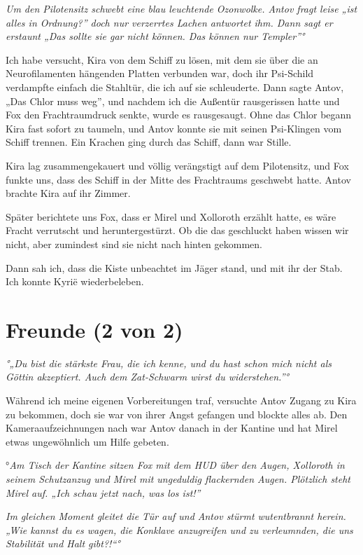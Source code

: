 \documentclass[11pt]{article}
\begin{document}
\emph{Um den Pilotensitz schwebt eine blau leuchtende Ozonwolke. Antov
fragt leise „ist alles in Ordnung?'' doch nur verzerrtes Lachen
antwortet ihm. Dann sagt er erstaunt „Das sollte sie gar nicht können.
Das können nur Templer''°}

Ich habe versucht, Kira von dem Schiff zu lösen, mit dem sie über die an
Neurofilamenten hängenden Platten verbunden war, doch ihr Psi-Schild
verdampfte einfach die Stahltür, die ich auf sie schleuderte. Dann sagte
Antov, „Das Chlor muss weg'', und nachdem ich die Außentür rausgerissen
hatte und Fox den Frachtraumdruck senkte, wurde es rausgesaugt. Ohne das
Chlor begann Kira fast sofort zu taumeln, und Antov konnte sie mit
seinen Psi-Klingen vom Schiff trennen. Ein Krachen ging durch das
Schiff, dann war Stille.

Kira lag zusammengekauert und völlig verängstigt auf dem Pilotensitz,
und Fox funkte uns, dass des Schiff in der Mitte des Frachtraums
geschwebt hatte. Antov brachte Kira auf ihr Zimmer.

Später berichtete uns Fox, dass er Mirel und Xolloroth erzählt hatte, es
wäre Fracht verrutscht und heruntergestürzt. Ob die das geschluckt haben
wissen wir nicht, aber zumindest sind sie nicht nach hinten gekommen.

Dann sah ich, dass die Kiste unbeachtet im Jäger stand, und mit ihr der
Stab. Ich konnte Kyrië wiederbeleben.

\section{Freunde (2 von 2)}

\emph{°„Du bist die stärkste Frau, die ich kenne, und du hast schon mich
nicht als Göttin akzeptiert. Auch dem Zat-Schwarm wirst du
widerstehen.''°}

Während ich meine eigenen Vorbereitungen traf, versuchte Antov Zugang zu
Kira zu bekommen, doch sie war von ihrer Angst gefangen und blockte
alles ab. Den Kameraaufzeichnungen nach war Antov danach in der Kantine
und hat Mirel etwas ungewöhnlich um Hilfe gebeten.

°\emph{Am Tisch der Kantine sitzen Fox mit dem HUD über den Augen,
Xolloroth in seinem Schutzanzug und Mirel mit ungeduldig flackernden
Augen. Plötzlich steht Mirel auf. „Ich schau jetzt nach, was los ist!''}

\emph{Im gleichen Moment gleitet die Tür auf und Antov stürmt
wutentbrannt herein. „Wie kannst du es wagen, die Konklave anzugreifen
und zu verleumnden, die uns Stabilität und Halt gibt?!``°}
\end{document}
